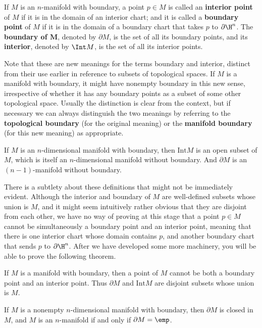 If $M$ is an $n$-manifold with boundary, a point $p\in M$ is called an \textbf{interior point} of $M$ if it is in the domain of an interior chart; and it is called a \textbf{boundary point} of $M$ if it is in the domain of a boundary chart that takes $p$ to $\partial\H^n$. The \textbf{boundary of $\bm{M}$}, denoted by $\partial M$, is the set of all its boundary points, and its \textbf{interior}, denoted by $\Int M$, is the set of all its interior points.\par
Note that these are new meanings for the terms boundary and interior, distinct from their use earlier in reference to subsets of topological spaces. If $M$ is a manifold with boundary, it might have nonempty boundary in this new sense, irrespective of whether it has any boundary points as a subset of some other topological space. Usually the distinction is clear from the context, but if necessary we can always distinguish the two meanings by referring to the \textbf{topological boundary} (for the original meaning) or the \textbf{manifold boundary} (for this new meaning) as appropriate.
\begin{theorem}\label{manifold boundary int open boundary mani}
If $M$ is an $n$-dimensional manifold with boundary, then $\mathrm{Int}M$ is an open subset of $M$, which is itself an $n$-dimensional manifold without boundary. And $\partial M$ is an $(n-1)$-manifold without boundary.
\end{theorem}
There is a subtlety about these definitions that might not be immediately evident. Although the interior and boundary of $M$ are well-defined subsets whose union is $M$, and it might seem intuitively rather obvious that they are disjoint from each other, we have no way of proving at this stage that a point $p\in M$ cannot be simultaneously a boundary point and an interior point, meaning that there is one interior chart whose domain contains $p$, and another boundary chart that sends $p$ to $\partial\H^n$.
After we have developed some more machinery, you will be able to prove the following theorem.
\begin{theorem}\label{invariance boundary}
If $M$ is a manifold with boundary, then a point of $M$ cannot be both a boundary point and an interior point. Thus $\partial M$ and $\mathrm{Int}M$ are disjoint subsets whose union is $M$.
\end{theorem}
\begin{corollary}
If $M$ is a nonempty $n$-dimensional manifold with boundary, then $\partial M$ is closed in $M$, and $M$ is an $n$-manifold if and only if $\partial M=\emp$.
\end{corollary}
